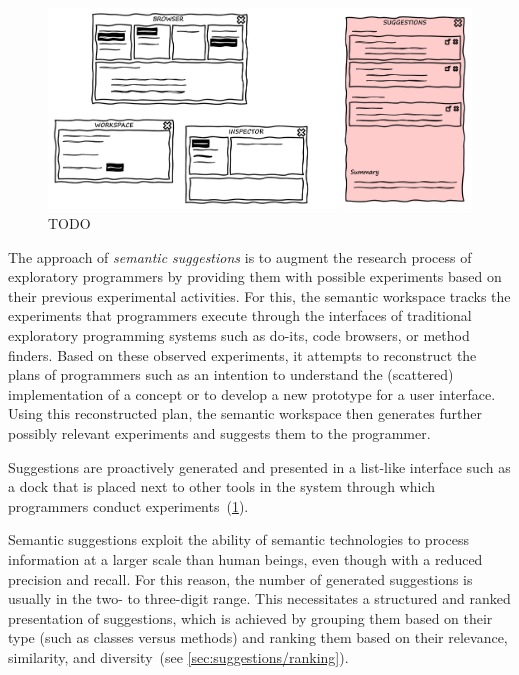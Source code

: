 \begin{figure}
	\centering
	\includegraphics[width=\textwidth]{02_workspace/suggestions.png}
	\caption[TODO]{
		TODO
	}
	\label{fig:approach/workspace/suggestions}
\end{figure}

The approach of \emph{semantic suggestions} is to augment the research process of exploratory programmers by providing them with possible experiments based on their previous experimental activities.
For this, the semantic workspace tracks the experiments that programmers execute through the interfaces of traditional exploratory programming systems such as do-its, code browsers, or method finders.
Based on these observed experiments, it attempts to reconstruct the plans of programmers such as an intention to understand the (scattered) implementation of a concept or to develop a new prototype for a user interface.
Using this reconstructed plan, the semantic workspace then generates further possibly relevant experiments and suggests them to the programmer.

Suggestions are proactively generated and presented in a list-like interface such as a dock that is placed next to other tools in the system through which programmers conduct experiments~(\cref{fig:approach/workspace/suggestions}).

Semantic suggestions exploit the ability of semantic technologies to process information at a larger scale than human beings, even though with a reduced precision and recall.
For this reason, the number of generated suggestions is usually in the two- to three-digit range.
This necessitates a structured and ranked presentation of suggestions, which is achieved by grouping them based on their type (such as classes versus methods) and ranking them based on their relevance, similarity, and diversity~(see \cref{sec:suggestions/ranking}).

